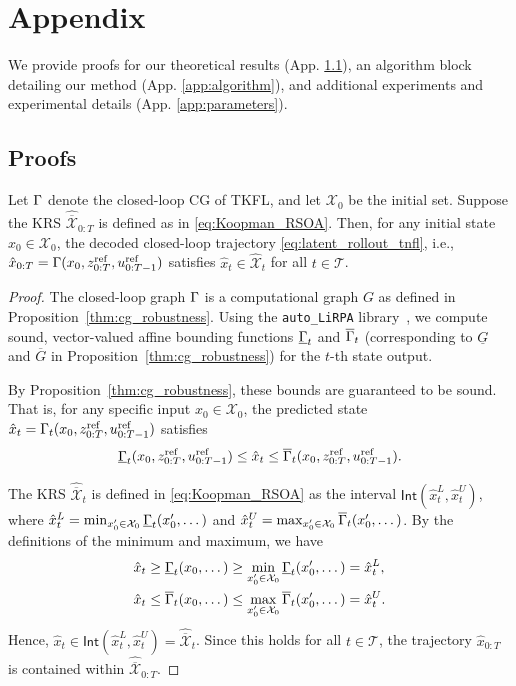 \newpage
\section{Appendix}
\label{Appendix}

We provide proofs for our theoretical results (App. \ref{app:proofs}), an algorithm block detailing our method (App. \ref{app:algorithm}), and additional experiments and experimental details (App. \ref{app:parameters}).
\subsection{Proofs}\label{app:proofs}
\setcounter{theorem}{0}
\begin{lemma}
\label{lem:koopman_containment}
Let $\Gamma$ denote the closed-loop CG of TKFL, and let $\mathcal{X}_0$ be the initial set. Suppose the KRS $\hat{\overline{\mathcal{X}}}_{0:T}$ is defined as in \eqref{eq:Koopman_RSOA}. Then, for any initial state $x_0 \in \mathcal{X}_0$, the decoded closed-loop trajectory \eqref{eq:latent_rollout_tnfl}, i.e., 
$\hat{x}_{0:T} = \Gamma(x_0, z^{\text{ref}}_{0:T}, u^{\text{ref}}_{0:T-1})$ satisfies $\hat{x}_t \in \hat{\mathcal{X}}_t$ for all $t \in \mathcal{T}$.
\end{lemma}

\begin{proof}
The closed-loop graph $\Gamma$ is a computational graph $G$ as defined in Proposition~\ref{thm:cg_robustness}. Using the \texttt{auto\_LiRPA} library~\cite{Xu2020AutoLiRPA}, we compute sound, vector-valued affine bounding functions $\underline{\Gamma}_t$ and $\overline{\Gamma}_t$ (corresponding to $\underline{G}$ and $\overline{G}$ in Proposition~\ref{thm:cg_robustness}) for the $t$-th state output.

By Proposition~\ref{thm:cg_robustness}, these bounds are guaranteed to be sound. That is, for any specific input $x_0 \in \mathcal{X}_0$, the predicted state 
$\hat{x}_t = \Gamma_t(x_0, z^{\text{ref}}_{0:T}, u^{\text{ref}}_{0:T-1})$ satisfies
\[
\underline{\Gamma}_t(x_0, z^{\text{ref}}_{0:T}, u^{\text{ref}}_{0:T-1}) 
\le \hat{x}_t 
\le \overline{\Gamma}_t(x_0, z^{\text{ref}}_{0:T}, u^{\text{ref}}_{0:T-1}).
\]

The KRS $\hat{\overline{\mathcal{X}}}_t$ is defined in \eqref{eq:Koopman_RSOA} as the interval $\textsf{Int}(\hat{x}_t^L, \hat{x}_t^U)$, where $\hat{x}_t^L = \min_{x_0' \in \mathcal{X}_0} \underline{\Gamma}_t(x_0', \dots)$ and $\hat{x}_t^U = \max_{x_0' \in \mathcal{X}_0} \overline{\Gamma}_t(x_0', \dots)$.
By the definitions of the minimum and maximum, we have
\begin{align*}
    \hat{x}_t 
    &\ge \underline{\Gamma}_t(x_0, \dots) 
     \ge \min_{x_0' \in \mathcal{X}_0} \underline{\Gamma}_t(x_0', \dots) 
     = \hat{x}_t^L,\\
    \hat{x}_t 
    &\le \overline{\Gamma}_t(x_0, \dots) 
     \le \max_{x_0' \in \mathcal{X}_0} \overline{\Gamma}_t(x_0', \dots) 
     = \hat{x}_t^U.
\end{align*}
Hence, $\hat{x}_t \in \textsf{Int}(\hat{x}_t^L, \hat{x}_t^U) = \hat{\overline{\mathcal{X}}}_t$. Since this holds for all $t \in \mathcal{T}$, the trajectory $\hat{x}_{0:T}$ is contained within $\hat{\overline{\mathcal{X}}}_{0:T}$.
\end{proof}

